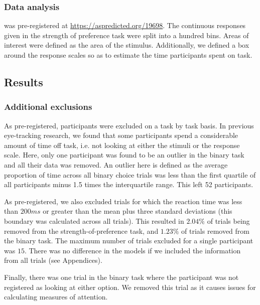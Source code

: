 \documentclass[doc, a4paper, apacite]{apa6}
\begin{document}
\subsubsection{Data analysis}
 was pre-registered at \url{https://aspredicted.org/19698}.
The continuous responses given in the strength of preference task were split into a hundred bins. Areas of interest were defined as the area of the stimulus. Additionally, we defined a box around the response scales so as to estimate the time participants spent on task. 

\subsection{Results}

\subsubsection{Additional exclusions}
As pre-registered, participants were excluded on a task by task basis. In previous eye-tracking research, we found that some participants spend a considerable amount of time off task, i.e. not looking at either the stimuli or the response scale. Here, only one participant was found to be an outlier in the binary task and all their data was removed. An outlier here is defined as the average proportion of time across all binary choice trials was less than the first quartile of all participants minus 1.5 times the interquartile range. This left 52 participants. 

As pre-registered, we also excluded trials for which the reaction time was less than $200ms$ or greater than the mean plus three standard deviations (this boundary was calculated across all trials). This resulted in $2.04\%$ of trials being removed from the strength-of-preference task, and $1.23\%$ of trials removed from the binary task. The maximum number of trials excluded for a single participant was $15$. There was no difference in the models if we included the information from all trials (see Appendices). 

Finally, there was one trial in the binary task where the participant was not registered as looking at either option. We removed this trial as it causes issues for calculating measures of attention. 
\end{document}
